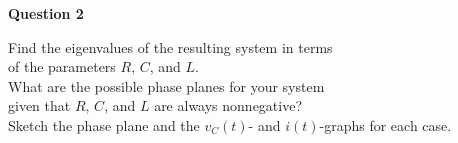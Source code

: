 \documentclass[preview]{standalone}
\begin{document}
\begin{center}
\textbf{Question 2} \\[10pt]
                    \raggedright
                    Find the eigenvalues of the resulting system in terms \\  
                    of the parameters $R$, $C$, and $L$. \\[5pt]
                    What are the possible phase planes for your system \\
                    given that $R$, $C$, and $L$ are always nonnegative? \\[5pt]
                    Sketch the phase plane and the $v_C(t)$- and $i(t)$-graphs for each case.
\end{center}
\end{document}
